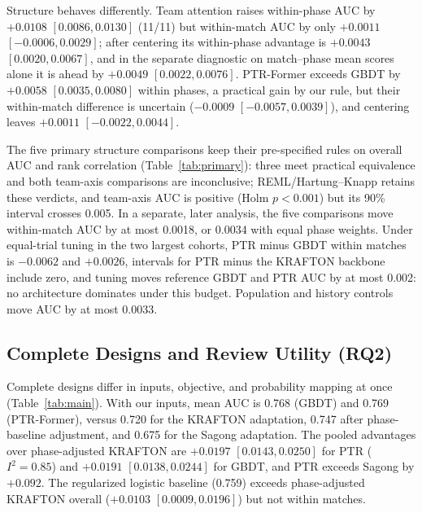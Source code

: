 \documentclass[sigconf,anonymous,nonacm]{acmart}
\begin{document}
Structure behaves differently. Team attention raises within-phase AUC by $+0.0108$ $[0.0086,\allowbreak 0.0130]$ (11/11) but within-match AUC by only $+0.0011$ $[-0.0006,\allowbreak 0.0029]$; after centering its within-phase advantage is $+0.0043$ $[0.0020,\allowbreak 0.0067]$, and in the separate diagnostic on match--phase mean scores alone it is ahead by $+0.0049$ $[0.0022,\allowbreak 0.0076]$. PTR-Former exceeds GBDT by $+0.0058$ $[0.0035,\allowbreak 0.0080]$ within phases, a practical gain by our rule, but their within-match difference is uncertain ($-0.0009$ $[-0.0057,\allowbreak 0.0039]$), and centering leaves $+0.0011$ $[-0.0022,\allowbreak 0.0044]$.


The five primary structure comparisons keep their pre-specified rules on overall AUC and rank correlation (Table~\ref{tab:primary}): three meet practical equivalence and both team-axis comparisons are inconclusive; REML/Hartung--Knapp retains these verdicts, and team-axis AUC is positive (Holm $p<0.001$) but its 90\% interval crosses 0.005. In a separate, later analysis, the five comparisons move within-match AUC by at most 0.0018, or 0.0034 with equal phase weights. Under equal-trial tuning in the two largest cohorts, PTR minus GBDT within matches is $-0.0062$ and $+0.0026$, intervals for PTR minus the KRAFTON backbone include zero, and tuning moves reference GBDT and PTR AUC by at most 0.002: no architecture dominates under this budget. Population and history controls move AUC by at most 0.0033.

\subsection{Complete Designs and Review Utility (RQ2)}
\label{sec:results:designs}

Complete designs differ in inputs, objective, and probability mapping at once (Table~\ref{tab:main}). With our inputs, mean AUC is 0.768 (GBDT) and 0.769 (PTR-Former), versus 0.720 for the KRAFTON adaptation, 0.747 after phase-baseline adjustment, and 0.675 for the Sagong adaptation. The pooled advantages over phase-adjusted KRAFTON are $+0.0197$ $[0.0143,\allowbreak 0.0250]$ for PTR ($I^2=0.85$) and $+0.0191$ $[0.0138,\allowbreak 0.0244]$ for GBDT, and PTR exceeds Sagong by $+0.092$. The regularized logistic baseline (0.759) exceeds phase-adjusted KRAFTON overall ($+0.0103$ $[0.0009,\allowbreak 0.0196]$) but not within matches.
\end{document}
